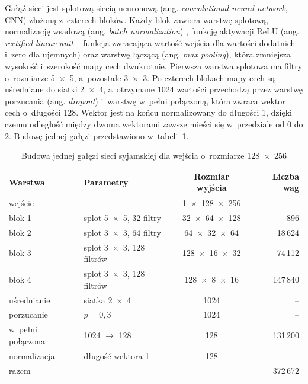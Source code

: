 \documentclass[12pt, twoside, openright]{article}
\begin{document}
Gałąź sieci jest splotową siecią neuronową (ang. \textit{convolutional neural network}, CNN) złożoną z~czterech bloków.
Każdy blok zawiera warstwę splotową, normalizację wsadową (ang. \textit{batch normalization}) \cite{ioffe2015}, funkcję aktywacji ReLU (ang. \textit{rectified linear unit} -- funkcja zwracająca wartość wejścia dla wartości dodatnich i~zero dla ujemnych) oraz warstwę łączącą (ang. \textit{max pooling}), która zmniejsza wysokość i~szerokość mapy cech dwukrotnie.
Pierwsza warstwa splotowa ma filtry o~rozmiarze 5~$\times$~5, a~pozostałe 3~$\times$~3.
Po czterech blokach mapy cech są uśredniane do siatki 2~$\times$~4, a~otrzymane 1024 wartości przechodzą przez warstwę porzucania (ang. \textit{dropout}) \cite{srivastava2014} i~warstwę w~pełni połączoną, która zwraca wektor cech o~długości 128.
Wektor jest na końcu normalizowany do długości 1, dzięki czemu odległość między dwoma wektorami zawsze mieści się w~przedziale od 0 do 2.
Budowę jednej gałęzi przedstawiono w~tabeli~\ref{Tab:siec}.

\begin{table}[ht]
\caption{Budowa jednej gałęzi sieci syjamskiej dla wejścia o~rozmiarze 128~$\times$~256}
\centering
	\begin{tabular}{|l|l|c|r|}
		\hline
		Warstwa & Parametry & Rozmiar wyjścia & Liczba wag \\
		\hline
		wejście & -- & 1~$\times$~128~$\times$~256 & -- \\
		blok 1 & splot 5~$\times$~5, 32 filtry & 32~$\times$~64~$\times$~128 & 896 \\
		blok 2 & splot 3~$\times$~3, 64 filtry & 64~$\times$~32~$\times$~64 & 18\,624 \\
		blok 3 & splot 3~$\times$~3, 128 filtrów & 128~$\times$~16~$\times$~32 & 74\,112 \\
		blok 4 & splot 3~$\times$~3, 128 filtrów & 128~$\times$~8~$\times$~16 & 147\,840 \\
		uśrednianie & siatka 2~$\times$~4 & 1024 & -- \\
		porzucanie & $p = 0{,}3$ & 1024 & -- \\
		w~pełni połączona & 1024 $\rightarrow$ 128 & 128 & 131\,200 \\
		normalizacja & długość wektora 1 & 128 & -- \\
		\hline
		razem & & & 372\,672 \\
		\hline
	\end{tabular}
\label{Tab:siec}
\end{table}
\end{document}
